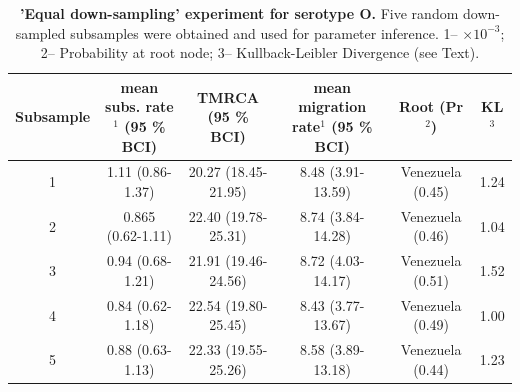 \documentclass[a4paper,10pt]{article}
\begin{document}
\newpage
\begin{table}
\medskip
\begin{minipage}{\textwidth}
\begin{center}
 \caption{ {{\bf 'Equal down-sampling' experiment for serotype O.}} Five random down-sampled subsamples were obtained and used for parameter inference.
1-- $\times 10^{-3}$; 2--  Probability at root node; 3-- Kullback-Leibler Divergence (see Text).}
\begin{tabular}{cccccc}
\toprule
Subsample	&mean subs. rate$^{1}$ (95 \% BCI)	&TMRCA (95 \% BCI)	&mean migration rate$^{1}$ (95 \% BCI)	&Root (Pr$^{2}$) & KL$^3$\\
\midrule
1	&1.11 (0.86-1.37)	&20.27 (18.45-21.95)	&8.48 (3.91-13.59)	&Venezuela  (0.45)& 1.24\\
2	&0.865 (0.62-1.11)	&22.40 (19.78-25.31)	&8.74 (3.84-14.28)	&Venezuela  (0.46)&1.04\\
3	&0.94 (0.68-1.21)	&21.91 (19.46-24.56)	&8.72 (4.03-14.17)	&Venezuela  (0.51)&1.52\\
4	&0.84 (0.62-1.18)	&22.54 (19.80-25.45)	&8.43 (3.77-13.67)	&Venezuela  (0.49)&1.00\\
5	&0.88 (0.63-1.13)	&22.33 (19.55-25.26)	&8.58 (3.89-13.18)	&Venezuela  (0.44)&1.23\\

\bottomrule
\end{tabular}
\label{stab:ED_O}
\end{center}
\end{minipage}
\end{table}
%
\end{document}
